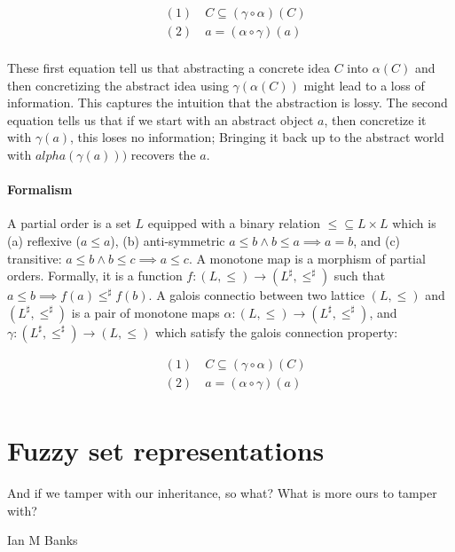 \documentclass[11pt]{book}
\begin{document}
\begin{align*}
    &(1) \quad C \subseteq (\gamma\circ \alpha)(C) \\
    &(2) \quad a = (\alpha \circ \gamma)(a) \\
\end{align*}

These first equation tell us that abstracting a concrete idea $C$ into
$\alpha(C)$ and then concretizing the abstract idea using $\gamma(\alpha(C))$
might lead to a loss of information. This captures the intuition that the abstraction
is lossy. The second equation tells us that if we start with an abstract object
$a$, then concretize it with $\gamma(a)$, this loses no information; Bringing
it back up to the abstract world with $alpha(\gamma(a)))$ recovers the $a$.

\subsubsection{Formalism}

A partial order is a set $L$ equipped with a binary relation $\leq \subseteq L
\times L$ which is (a) reflexive ($a \leq a$), (b) anti-symmetric $a \leq b
\land b \leq a \implies a = b$, and (c) transitive: $a \leq b \land b \leq c
\implies a \leq c$.  A monotone map is a morphism of partial orders. Formally,
it is a function $f: (L, \leq) \rightarrow (L^\sharp, \leq^\sharp)$ such that
$a \leq b \implies f(a) \leq^\sharp f(b)$.  A galois connectio between two
lattice $(L, \leq)$ and $(L^\sharp, \leq^\sharp)$ is a pair of monotone maps
$\alpha: (L, \leq) \rightarrow (L^\sharp, \leq^\sharp)$, and
$\gamma: (L^\sharp, \leq^\sharp) \rightarrow  (L, \leq)$ which satisfy the
galois connection property:

\begin{align*}
    &(1) \quad C \subseteq (\gamma\circ \alpha)(C) \\
    &(2) \quad a = (\alpha \circ \gamma)(a) \\
\end{align*}


\chapter{Fuzzy set representations}
\label{chapter:fuzzy-set-representation}

\epigraph{And if we tamper with our inheritance, so what? What is more ours to tamper with?}{Ian M Banks}
\end{document}
